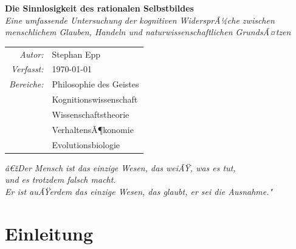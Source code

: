 ﻿\documentclass[12pt, a4paper]{article}
\begin{document}
\begin{titlepage}
  \centering
  \vspace*{2cm}

  {\LARGE\bfseries Die Sinnlosigkeit des rationalen Selbstbildes}\\[1em]
  {\large\itshape Eine umfassende Untersuchung der kognitiven WidersprÃ¼che zwischen\\[0.3em]
  menschlichem Glauben, Handeln und naturwissenschaftlichen GrundsÃ¤tzen}

  \vspace{2cm}

  \begin{tabular}{rl}
    \textit{Autor:}         & Stephan Epp \\[0.5em]
    \textit{Verfasst:}      & \today \\[0.5em]
    \textit{Bereiche:}      & Philosophie des Geistes\\
                             & Kognitionswissenschaft\\
                             & Wissenschaftstheorie\\
                             & VerhaltensÃ¶konomie\\
                             & Evolutionsbiologie \\
  \end{tabular}

  \vfill

  \begin{infobox}
    \centering\small\itshape
    â€žDer Mensch ist das einzige Wesen, das weiÃŸ, was es tut,\\
    und es trotzdem falsch macht.\\[0.3em]
    Er ist auÃŸerdem das einzige Wesen, das glaubt, er sei die Ausnahme."
  \end{infobox}
\end{titlepage}

\newpage
\tableofcontents
\newpage

\section{Einleitung}
\end{document}
